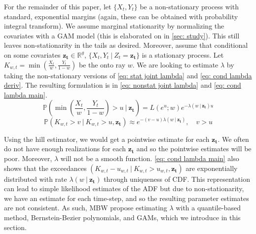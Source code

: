 \documentclass[12pt]{article}
\begin{document}
  For the remainder of this paper, let $\{ X_t, Y_t\}$  be a non-stationary process with standard, exponential margins (again, these can be obtained with probability integral transform).  
  We assume marginal stationarity by normalizing the covariates with a GAM model (this is elaborated on in \cref{sec: study}).
  This still leaves non-stationarity in the tails as desired.
  Moreover, assume that conditional on some covariates $\boldsymbol{z_t} \in \mathbb{R}^g$, $\{ X_t, Y_t \ |\ Z_t = \boldsymbol{z_t}\}$ is a stationary process.
  Let $K_{w, t} = \min\left(\frac{X_t}{w}, \frac{Y_t}{1 - w} \right)$ be the  onto ray $w$. We are looking to estimate $\lambda$ by taking the non-stationary versions of \cref{eq: stat joint lambda} and \cref{eq: cond lambda deriv}. The resulting formulation is in \cref{eq: nonstat joint lambda} and \cref{eq: cond lambda main}.
  \begin{equation} \label{eq: nonstat joint lambda}
    \mathbb{P}\left(\min\left(\frac{X_t}{w}, \frac{Y_t}{1 - w} \right) > u \ |\ \boldsymbol{z_t}  \right) = L(e^u; w)e^{-\lambda(w \ |\ \boldsymbol{z_t}) u}
  \end{equation}
  \begin{equation} \label{eq: cond lambda main}
    \mathbb{P}(K_{w, t} > v \ |\ K_{w, t} > u, \boldsymbol{z_t}) \approx e^{-(v - u)\lambda(w \ |\ \boldsymbol{z_t})} ,\quad v > u
  \end{equation}

  Using the hill estimator, we would get a pointwise estimate for each $\boldsymbol{z_t}$. 
  We often do not have enough realizations for each $\boldsymbol{z_t}$ and so the pointwise estimates will be poor. Moreover, $\lambda$ will not be a smooth function.
  \cref{eq: cond lambda main} also shows that the exceedances $(K_{w, t} - u_{w, t} \ |\ K_{w, t} > u_{w, t}, \boldsymbol{z_t})$ are exponentially distributed with rate $\lambda(w \ |\ \boldsymbol{z_t})$ through uniqueness of CDF. 
  This representation can lead to simple likelihood estimates of the ADF but due to non-stationarity, we have an estimate for each time-step, and so the resulting parameter estimates are not consistent. 
  As such, MBW propose estimating $\lambda$ with a quantile-based method, Bernstein-Bezier polynomials, and GAMs, which we introduce in this section.
\end{document}
